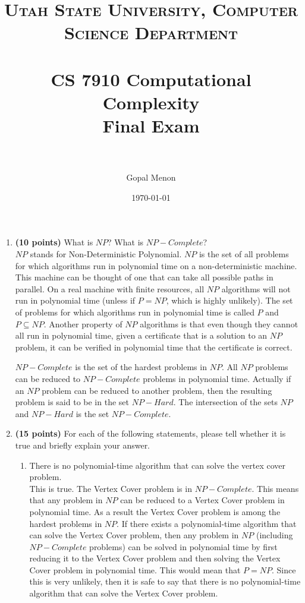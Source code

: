 \documentclass[paper=a4, fontsize=11pt]{scrartcl} %
\title{	
\normalfont \normalsize 
\textsc{Utah State University, Computer Science Department} \\ [25pt] %
\horrule{0.5pt} \\[0.4cm] %
\huge CS 7910 Computational Complexity\\Final Exam\\ %
\horrule{2pt} \\[0.5cm] %
}
\author{Gopal Menon} %
\date{\normalsize\today} %
\numberwithin{figure}{section} %
\numberwithin{table}{section} %
\begin{document}
\maketitle %

\begin{enumerate}
\item \textbf{(10 points)} What is $NP$? What is $NP-Complete$?\\

$NP$ stands for Non-Deterministic Polynomial. $NP$ is the set of all problems for which algorithms run in polynomial time on a non-deterministic machine. This machine can be thought of one that can take all possible paths in parallel. On a real machine with finite resources, all $NP$ algorithms will not run in polynomial time (unless if $P = NP$, which is highly unlikely). The set of problems for which algorithms run in polynomial time is called $P$ and $P \subseteq NP$. Another property of $NP$ algorithms is that even though they cannot all run in polynomial time, given a certificate that is a solution to an $NP$ problem, it can be verified in polynomial time that the certificate is correct.

$NP-Complete$ is the set of the hardest problems in $NP$. All $NP$ problems can be reduced to $NP-Complete$ problems in polynomial time. Actually if an $NP$ problem can be reduced to another problem, then the resulting problem is said to be in the set $NP-Hard$. The intersection of the sets $NP$ and $NP-Hard$ is the set $NP-Complete$.

\item \textbf{(15 points)} For each of the following statements, please tell whether it is true and briefly explain your answer.

\begin{enumerate}

\item There is no polynomial-time algorithm that can solve the vertex cover problem.\\

This is true. The Vertex Cover problem is in $NP-Complete$. This means that any problem in $NP$ can be reduced to a Vertex Cover problem in polynomial time. As a result the Vertex Cover problem is among the hardest problems in $NP$. If there exists a polynomial-time algorithm that can solve the Vertex Cover problem, then any problem in $NP$ (including $NP-Complete$ problems) can be solved in polynomial time by first reducing it to the Vertex Cover problem and then solving the Vertex Cover problem in polynomial time. This would mean that $P = NP$. Since this is very unlikely, then it is safe to say that there is no polynomial-time algorithm that can solve the Vertex Cover problem.


\end{enumerate}
\end{enumerate}
\end{document}
